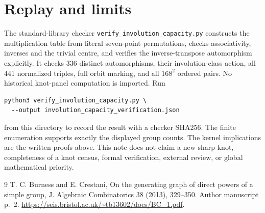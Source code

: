 \documentclass[11pt]{article}
\begin{document}
\section{Replay and limits}

The standard-library checker \texttt{verify\_involution\_capacity.py}
constructs the multiplication table from literal seven-point
permutations, checks associativity, inverses and the trivial centre,
and verifies the inverse-transpose automorphism explicitly.
It checks 336 distinct automorphisms, their involution-class action,
all 441 normalized triples, full orbit marking, and all $168^2$
ordered pairs.  No historical knot-panel computation is imported.
Run
\begin{verbatim}
python3 verify_involution_capacity.py \
  --output involution_capacity_verification.json
\end{verbatim}
from this directory to record the result with a checker SHA256.
The finite enumeration supports exactly the displayed group counts.
The kernel implications are the written proofs above.  This note
does not claim a new sharp knot, completeness of a knot census,
formal verification, external review, or global mathematical priority.

\begin{thebibliography}{9}
 T. C. Burness and E. Crestani,
On the generating graph of direct powers of a simple group,
J. Algebraic Combinatorics 38 (2013), 329--350.
Author manuscript p.~2.
\url{https://seis.bristol.ac.uk/~tb13602/docs/BC_1.pdf}.
\end{thebibliography}
\end{document}

